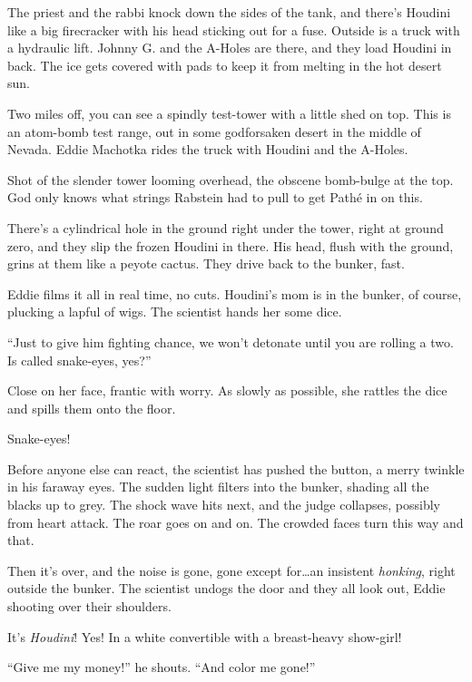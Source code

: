 The priest and the rabbi knock down the sides of the tank, and there's Houdini like a big firecracker with his head sticking out for a fuse. Outside is a truck with a hydraulic lift. Johnny G. and the A-Holes are there, and they load Houdini in back. The ice gets covered with pads to keep it from melting in the hot desert sun.

Two miles off, you can see a spindly test-tower with a little shed on top. This is an atom-bomb test range, out in some godforsaken desert in the middle of Nevada. Eddie Machotka rides the truck with Houdini and the A-Holes.

Shot of the slender tower looming overhead, the obscene bomb-bulge at the top. God only knows what strings Rabstein had to pull to get Pathé in on this.

There's a cylindrical hole in the ground right under the tower, right at ground zero, and they slip the frozen Houdini in there. His head, flush with the ground, grins at them like a peyote cactus. They drive back to the bunker, fast.

Eddie films it all in real time, no cuts. Houdini's mom is in the bunker, of course, plucking a lapful of wigs. The scientist hands her some dice.

``Just to give him fighting chance, we won't detonate until you are rolling a two. Is called snake-eyes, yes?''

Close on her face, frantic with worry. As slowly as possible, she rattles the dice and spills them onto the floor.

Snake-eyes!

Before anyone else can react, the scientist has pushed the button, a merry twinkle in his faraway eyes. The sudden light filters into the bunker, shading all the blacks up to grey. The shock wave hits next, and the judge collapses, possibly from heart attack. The roar goes on and on. The crowded faces turn this way and that.

Then it's over, and the noise is gone, gone except for\ldots an insistent \textit{honking}, right outside the bunker. The scientist undogs the door and they all look out, Eddie shooting over their shoulders.

It's \textit{Houdini}! Yes! In a white convertible with a breast-heavy show-girl!

``Give me my money!'' he shouts. ``And color me gone!''